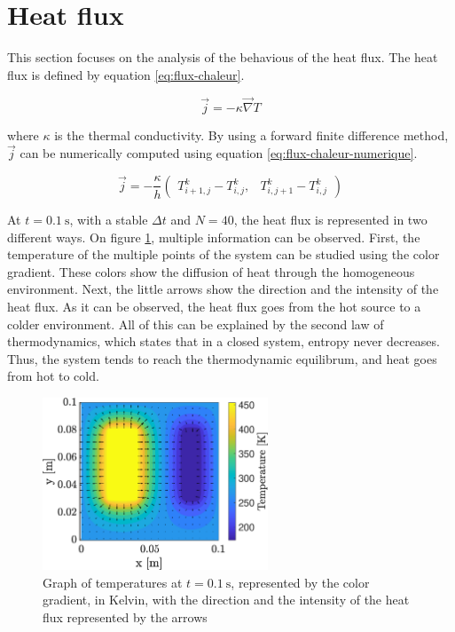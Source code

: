 \documentclass[a4paper,12pt,twoside]{article}
\begin{document}
\section{Heat flux}
This section focuses on the analysis of the behavious of the heat flux.
The heat flux is defined by equation \eqref{eq:flux-chaleur}.

\begin{equation}
  \vec{j} = -\kappa\vec{\nabla} T
  \label{eq:flux-chaleur}
\end{equation}

where $\kappa$ is the thermal conductivity.
By using a forward finite difference method, $\vec{j}$ can be numerically computed using equation \eqref{eq:flux-chaleur-numerique}.

\begin{equation}
  \vec{j} = -\frac{\kappa}{h}
  \begin{pmatrix}
    T^k_{i+1,j} - T^k_{i,j}, & T^k_{i,j+1} - T^k_{i,j}
  \end{pmatrix}
  \label{eq:flux-chaleur-numerique}
\end{equation}

At $t=\SI{0.1}{\s}$, with a stable $\Delta t$ and $N=40$, the heat flux is represented in two different ways.
On figure \ref{fig:c-temp}, multiple information can be observed.
First, the temperature of the multiple points of the system can be studied using the color gradient.
These colors show the diffusion of heat through the homogeneous environment.
Next, the little arrows show the direction and the intensity of the heat flux.
As it can be observed, the heat flux goes from the hot source to a colder environment.
All of this can be explained by the second law of thermodynamics, which states that in a closed system, entropy never decreases. \cite{wiki:2nd-law}
Thus, the system tends
 to reach the thermodynamic equilibrum, and heat goes from hot to cold. %


\begin{figure}[h]
  \centering
  \includegraphics[width=0.6\textwidth]{graphs/c_temp.eps}
  \caption{Graph of temperatures at $t=\SI{0.1}{\s}$, represented by the color gradient, in Kelvin, with the direction and the intensity of the heat flux represented by the arrows}
  \label{fig:c-temp}
\end{figure}
\end{document}
